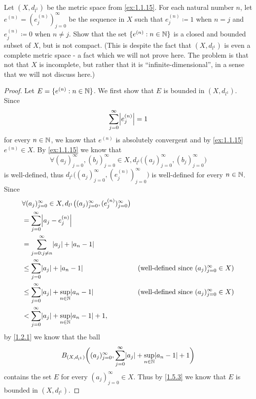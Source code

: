 \begin{ex}\label{ex:1.5.8}
  Let \((X, d_{l^1})\) be the metric space from \cref{ex:1.1.15}.
  For each natural number \(n\), let \(e^{(n)} = (e_j^{(n)})_{j = 0}^\infty\) be the sequence in \(X\) such that \(e_j^{(n)} \coloneqq 1\) when \(n = j\) and \(e_j^{(n)} \coloneqq 0\) when \(n \neq j\).
  Show that the set \(\{e^{(n)} : n \in \mathbb{N}\}\) is a closed and bounded subset of \(X\), but is not compact.
  (This is despite the fact that \((X, d_{l^1})\) is even a complete metric space
  - a fact which we will not prove here.
  The problem is that not that \(X\) is incomplete, but rather that it is ``infinite-dimensional'', in a sense that we will not discuss here.)
\end{ex}

\begin{proof}
  Let \(E = \{e^{(n)} : n \in \mathbb{N}\}\).
  We first show that \(E\) is bounded in \((X, d_{l^1})\).
  Since
  \[
    \sum_{j = 0}^\infty \abs{e_j^{(n)}} = 1
  \]
  for every \(n \in \mathbb{N}\), we know that \(e^{(n)}\) is absolutely convergent and by \cref{ex:1.1.15} \(e^{(n)} \in X\).
  By \cref{ex:1.1.15} we know that
  \[
    \forall (a_j)_{j = 0}^\infty, (b_j)_{j = 0}^\infty \in X, d_{l^1}\big((a_j)_{j = 0}^\infty, (b_j)_{j = 0}^\infty\big)
  \]
  is well-defined, thus \(d_{l^1}\big((a_j)_{j = 0}^\infty, (e_j^{(n)})_{j = 0}^\infty\big)\) is well-defined for every \(n \in \mathbb{N}\).
  Since
  \begin{align*}
     & \forall (a_j)_{j = 0}^\infty \in X, d_{l^1}\big((a_j)_{j = 0}^\infty, (e_j^{(n)})_{j = 0}^\infty\big)                                                              \\
     & = \sum_{j = 0}^\infty \abs{a_j - e_j^{(n)}}                                                                                                                        \\
     & = \sum_{j = 0 : j \neq n}^\infty \abs{a_j} + \abs{a_n - 1}                                                                                                         \\
     & \leq \sum_{j = 0}^\infty \abs{a_j} + \abs{a_n - 1}                                                    & \text{(well-defined since \((a_j)_{j = 0}^\infty \in X\))} \\
     & \leq \sum_{j = 0}^\infty \abs{a_j} + \sup_{n \in \N}\abs{a_n - 1}                                     & \text{(well-defined since \((a_j)_{j = 0}^\infty \in X\))} \\
     & < \sum_{j = 0}^\infty \abs{a_j} + \sup_{n \in \N}\abs{a_n - 1} + 1,
  \end{align*}
  by \cref{1.2.1} we know that the ball
  \[
    B_{(X, d_{l^1})}\bigg((a_j)_{j = 0}^\infty, \sum_{j = 0}^\infty \abs{a_j} + \sup_{n \in \N}\abs{a_n - 1} + 1\bigg)
  \]
  contains the set \(E\) for every \((a_j)_{j = 0}^\infty \in X\).
  Thus by \cref{1.5.3} we know that \(E\) is bounded in \((X, d_{l^1})\).


\end{proof}
